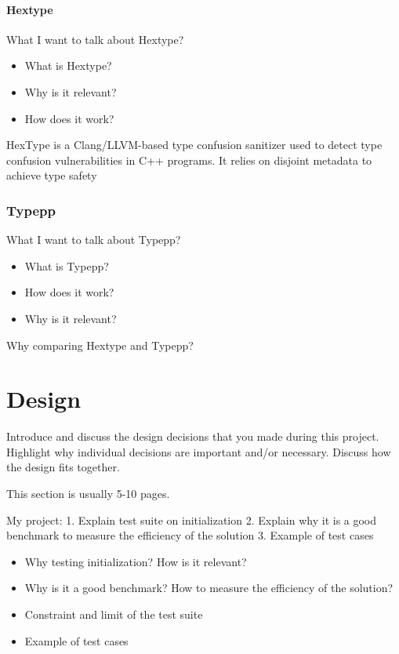 \documentclass[a4paper,11pt,oneside]{report}
\begin{document}
\subsubsection{Hextype}

What I want to talk about Hextype?
\begin{itemize}
       \item What is Hextype?
       \item Why is it relevant?
       \item How does it work?
\end{itemize}

HexType is a Clang/LLVM-based type confusion sanitizer used to detect type confusion vulnerabilities in C++ programs. It relies on disjoint metadata to achieve type safety 

\subsection{Typepp}

What I want to talk about Typepp?
\begin{itemize}
       \item What is Typepp?
       \item How does it work?
       \item Why is it relevant?

\end{itemize}

Why comparing Hextype and Typepp?

\chapter{Design}

Introduce and discuss the design decisions that you made during this project.
Highlight why individual decisions are important and/or necessary. Discuss
how the design fits together.

This section is usually 5-10 pages.

My project:
1. Explain test suite on initialization 
2. Explain why it is a good benchmark to measure the efficiency of the solution
3. Example of test cases

\begin{itemize}
       \item Why testing initialization? How is it relevant?
       \item Why is it a good benchmark? How to measure the efficiency of the solution?
       \item Constraint and limit of the test suite
       \item Example of test cases

\end{itemize}
\end{document}
